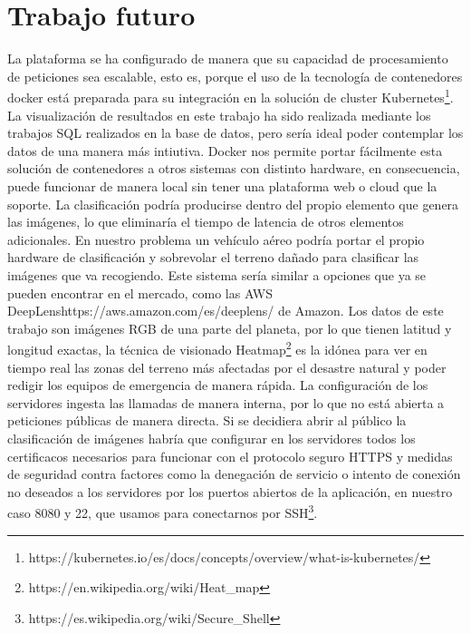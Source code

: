 \section{Trabajo futuro}\label{sec:trabajo-futuro}
La plataforma se ha configurado de manera que su capacidad de procesamiento de peticiones sea escalable, esto es, porque el uso de la tecnología de contenedores docker
está preparada para su integración en la solución de cluster Kubernetes\footnote{https://kubernetes.io/es/docs/concepts/overview/what-is-kubernetes/}.
La visualización de resultados en este trabajo ha sido realizada mediante los trabajos SQL realizados en la base de datos, pero sería ideal poder contemplar los datos de una manera más intiutiva.
Docker nos permite portar fácilmente esta solución de contenedores a otros sistemas con distinto hardware, en consecuencia, puede funcionar de manera local sin tener una plataforma web o cloud que la soporte.
La clasificación podría producirse dentro del propio elemento que genera las imágenes, lo que eliminaría el tiempo de latencia de otros elementos adicionales.
En nuestro problema un vehículo aéreo podría portar el propio hardware de clasificación y sobrevolar el terreno dañado para clasificar las imágenes que va recogiendo.
Este sistema sería similar a opciones que ya se pueden encontrar en el mercado, como las AWS DeepLens{https://aws.amazon.com/es/deeplens/} de Amazon.
Los datos de este trabajo son imágenes RGB de una parte del planeta, por lo que tienen latitud y longitud exactas, la técnica de visionado Heatmap\footnote{https://en.wikipedia.org/wiki/Heat_map} es la idónea para ver en tiempo real las zonas del terreno más afectadas por el desastre natural y poder redigir los equipos de emergencia de manera rápida.
La configuración de los servidores ingesta las llamadas de manera interna, por lo que no está abierta a peticiones públicas de manera directa.
Si se decidiera abrir al público la clasificación de imágenes habría que configurar en los servidores todos los certificacos necesarios para funcionar con el protocolo seguro HTTPS y medidas de seguridad contra factores como la denegación de servicio o intento de conexión no deseados a los servidores por los puertos abiertos de la aplicación, en nuestro caso 8080 y 22, que usamos para conectarnos por SSH\footnote{https://es.wikipedia.org/wiki/Secure_Shell}.

